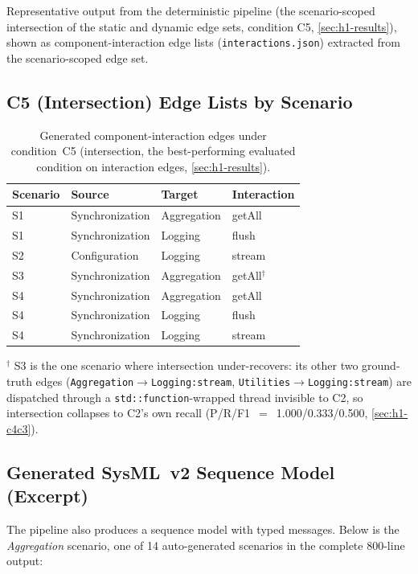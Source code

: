 Representative output from the deterministic pipeline (the
scenario-scoped intersection of the static and dynamic edge sets,
condition C5, \cref{sec:h1-results}), shown as component-interaction
edge lists (\texttt{interactions.json}) extracted from the
scenario-scoped edge set.

\subsection{C5 (Intersection) Edge Lists by Scenario}

\begin{table}[h]
\centering
\caption{Generated component-interaction edges under condition~C5
  (intersection, the best-performing evaluated condition on interaction
  edges, \cref{sec:h1-results}).}
\label{tab:c5-edges}
\begin{tabular}{llll}
\toprule
\textbf{Scenario} & \textbf{Source} & \textbf{Target} & \textbf{Interaction} \\
\midrule
S1 & Synchronization & Aggregation & getAll \\
S1 & Synchronization & Logging     & flush \\
\midrule
S2 & Configuration   & Logging     & stream \\
\midrule
S3 & Synchronization & Aggregation & getAll$^\dagger$ \\
\midrule
S4 & Synchronization & Aggregation & getAll \\
S4 & Synchronization & Logging     & flush \\
S4 & Synchronization & Logging     & stream \\
\bottomrule
\end{tabular}
\end{table}

$^\dagger$ S3 is the one scenario where intersection under-recovers:
its other two ground-truth edges
(\texttt{Aggregation}$\to$\texttt{Logging:stream},
\texttt{Utilities}$\to$\texttt{Logging:stream}) are dispatched through a
\texttt{std::function}-wrapped thread invisible to C2, so intersection
collapses to C2's own recall (P/R/F1~$=$~1.000/0.333/0.500,
\cref{sec:h1-c4c3}).

\subsection{Generated SysML~v2 Sequence Model (Excerpt)}

The pipeline also produces a \sysml sequence model with typed messages.
Below is the \emph{Aggregation} scenario, one of 14 auto-generated
scenarios in the complete 800-line output:

